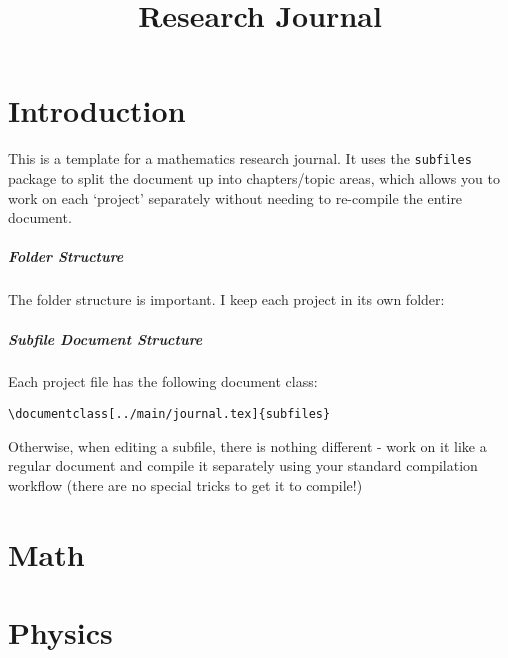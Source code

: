\documentclass[12pt]{book}
\title{Research Journal}
\begin{document}
\renewcommand{\printbib}[1]{}%

\maketitle
\tableofcontents

\chapter{Introduction}
This is a template for a mathematics research journal.  It uses the \verb|subfiles| package to split the document up into chapters/topic areas, which allows you to work on each `project' separately without needing to re-compile the entire document. 

\paragraph{Folder Structure}
The folder structure is important.  I keep each project in its own folder: 


\paragraph{Subfile Document Structure}Each project file has the following document class: 
\begin{verbatim}
\documentclass[../main/journal.tex]{subfiles}
\end{verbatim}  Otherwise, when editing a subfile, there is nothing different - work on it like a regular document and compile it separately using your standard compilation workflow (there are no special tricks to get it to compile!)


\chapter{Math}


\chapter{Physics}






\end{document}
